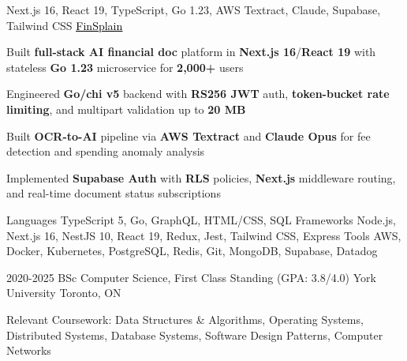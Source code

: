 \documentclass[11pt, a4paper]{awesome-cv}
\begin{document}
\begin{cventries}
\end{cventries}


\begin{cventries}

  \cventry
  {Next.js 16, React 19, TypeScript, Go 1.23, AWS Textract, Claude, Supabase, Tailwind CSS}
  {\href{https://finsplain.net}{\textcolor{black}{\underline{FinSplain}} \faExternalLink}}
  {}
  {}
  {
    \begin{cvitems}
      \item {Built \textbf{full-stack AI financial doc} platform in \textbf{Next.js 16}/\textbf{React 19} with stateless \textbf{Go 1.23} microservice for \textbf{2,000+} users}
      \item {Engineered \textbf{Go/chi v5} backend with \textbf{RS256 JWT} auth, \textbf{token-bucket rate limiting}, and multipart validation up to \textbf{20 MB}}
      \item {Built \textbf{OCR-to-AI} pipeline via \textbf{AWS Textract} and \textbf{Claude Opus} for fee detection and spending anomaly analysis}
      \item {Implemented \textbf{Supabase Auth} with \textbf{RLS} policies, \textbf{Next.js} middleware routing, and real-time document status subscriptions}
    \end{cvitems}
  }

\end{cventries}


\begin{cvskills}
  \cvskill
  {Languages}
  {TypeScript 5, Go, GraphQL, HTML/CSS, SQL}
  \cvskill
  {Frameworks}
  {Node.js, Next.js 16, NestJS 10, React 19, Redux, Jest, Tailwind CSS, Express}
  \cvskill
  {Tools}
  {AWS, Docker, Kubernetes, PostgreSQL, Redis, Git, MongoDB, Supabase, Datadog}
\end{cvskills}

\vspace{-2mm}

\begin{cventries}
  \cventry
  {2020-2025}
  {BSc Computer Science, First Class Standing (GPA: 3.8/4.0)}
  {York University}
  {Toronto, ON}
  {%
    \begin{cvitems}
      \item {Relevant Coursework: Data Structures \& Algorithms, Operating Systems, Distributed Systems, Database Systems, Software Design Patterns, Computer Networks}
    \end{cvitems}
  }
\end{cventries}

\end{document}
